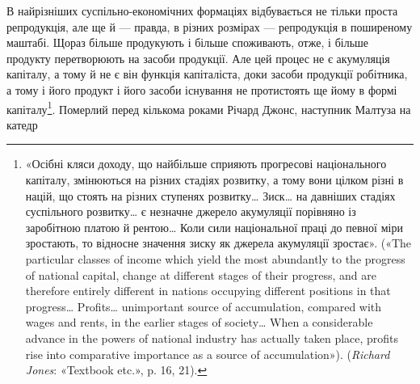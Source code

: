 В найрізніших суспільно-економічних формаціях відбувається
не тільки проста репродукція, але ще й — правда, в різних
розмірах — репродукція в поширеному маштабі. Щораз більше
продукують і більше споживають, отже, і більше продукту перетворюють
на засоби продукції. Але цей процес не є акумуляція
капіталу, а тому й не є він функція капіталіста, доки засоби продукції
робітника, а тому і його продукт і його засоби існування
не протистоять ще йому в формі капіталу\footnote{
«Осібні кляси доходу, що найбільше сприяють прогресові національного
капіталу, змінюються на різних стадіях розвитку, а тому вони
цілком різні в націй, що стоять на різних ступенях розвитку\dots{} Зиск\dots{}
на давніших стадіях суспільного розвитку\dots{} є незначне джерело акумуляції
порівняно із заробітною платою й рентою\dots{} Коли сили національної
праці до певної міри зростають, то відносне значення зиску як
джерела акумуляції зростає». («The particular classes of income which
yield the most abundantly to the progress of national capital, change at
different stages of their progress, and are therefore entirely different in
nations occupying different positions in that progress\dots{} Profits\dots{} unimportant
source of accumulation, compared with wages and rents, in the
earlier stages of society\dots{} When a considerable advance in the powers of
national industry has actually taken place, profits rise into comparative
importance as a source of accumulation»). (\emph{Richard Jones}: «Textbook
etc.», p. 16, 21).
}. Померлий перед
кількома роками Річард Джонс, наступник Малтуза на катедр
\parbreak{}  %
